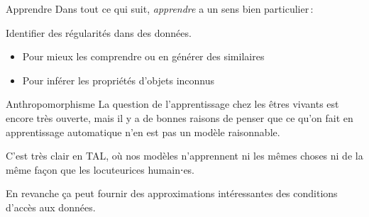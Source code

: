 \documentclass[
	xcolor={svgnames},
	aspectratio=169,
	french,
]{beamer}
\begin{document}
\begin{frame}
\begin{center}
	\end{center}
\end{frame}

\begin{frame}{Apprendre}
	Dans tout ce qui suit, \textit{\alert{apprendre}} a un sens bien particulier :


	\vfill
	\begin{center}
		\Large\alert{Identifier des régularités dans des données.}
	\end{center}

	\vfill
	\begin{itemize}
		\item<3->[→] Pour mieux les \alert<4-5>{comprendre} ou en générer des similaires\onslide<5->{ : \alert{non-supervisé}}
		\item<4->[→] Pour \alert<4-5>{inférer} les propriétés d'objets inconnus\onslide<6>{ : \alert{supervisé}}
	\end{itemize}
\end{frame}

\begin{frame}{Anthropomorphisme}
	La question de l'apprentissage chez les êtres vivants est encore très ouverte, mais il y a de bonnes raisons de penser que ce qu'on fait en apprentissage automatique n'en est \alert{pas} un modèle raisonnable.

	\pause

	C'est très clair en TAL, où nos modèles n'apprennent ni les mêmes choses ni de la même façon que les locuteurices humain⋅es.

	\pause

	En revanche ça peut fournir des approximations intéressantes des conditions d'\alert{accès aux données}.
\end{frame}
\end{document}
